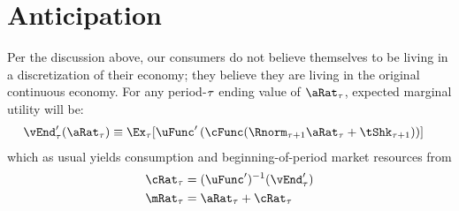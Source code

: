 \documentclass[../BufferStockTheory.tex]{subfiles}\usepackage{ApndxSteadyState}
\begin{document}
  \section{Anticipation}
  Per the discussion above, our consumers do not believe themselves to be living in a discretization of their economy; they believe they are living in the original continuous economy.
  For any period-$\tau$ ending value of $\point_{\tAbs}$, expected marginal utility will be:
  \begin{align}
    \vEnd^{\prime}_{\tAbs}(\point_{\tAbs}) & \equiv \Ex_{\tAbs}[\uFunc^{\prime}\left(\cFunc(\Rnorm_{\tAbs+1} \point_{\tAbs} + \tShk_{\tAbs+1})\right)]
  \end{align}
  which as usual yields consumption and beginning-of-period market resources from
  \begin{align}
    \cRat_{\tAbs} & = (\uFunc^{\prime})^{-1}(\vEnd^{\prime}_{\tAbs})
    \\ \mRat_{\tAbs} & = \point_{\tAbs}+\cRat_{\tAbs}
  \end{align}
  \pagebreak
  \onlyinsubfile{}
  \appendix
\end{document}
